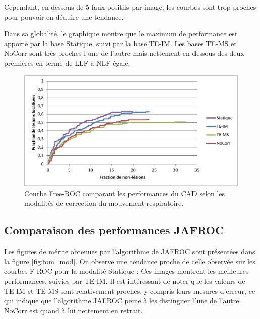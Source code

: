 Cependant, en dessous de 5 faux positifs par image, les courbes sont trop proches pour pouvoir en déduire une tendance.


Dans sa globalité, le graphique montre que le maximum de performance est apporté par la base Statique, suivi par la base TE-IM. Les bases TE-MS et NoCorr sont très proches l'une de l'autre mais nettement en dessous des deux premières en terme de LLF à NLF égale.

\begin{figure}[h!]
 \begin{center}
   \includegraphics[width=13cm]{images/FROC_mod}
 \end{center}
 \caption{Courbe Free-ROC comparant les performances du CAD selon les modalités de correction du mouvement respiratoire.}
 \label{fig:froc_mod}
\end{figure}


\subsection{Comparaison des performances JAFROC}

Les figures de mérite obtenues par l'algorithme de JAFROC sont présentées dans la figure \ref{fig:fom_mod}. On observe une tendance proche de celle observée sur les courbes F-ROC pour la modalité Statique : Ces images montrent les meilleures performances, suivies par TE-IM. Il est intéressant de noter que les valeurs de TE-IM et TE-MS sont relativement proches, y compris leurs mesures d'erreur, ce qui indique que l'algorithme JAFROC peine à les distinguer l'une de l'autre. NoCorr est quand à lui nettement en retrait. 

